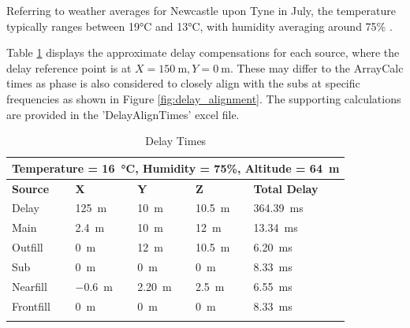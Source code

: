         Referring to weather averages for Newcastle upon Tyne in July, the temperature typically ranges between 19°C and 13°C, with humidity averaging around 75\% \citep{worldweatheronline2023}.

        Table \ref{tab:delay_times} displays the approximate delay compensations for each source, where the delay reference point is at $X=\SI{150}{\metre}, Y=\SI{0}{\metre}$. These may differ to the ArrayCalc times as phase is also considered to closely align with the subs at specific frequencies as shown in Figure \ref{fig:delay_alignment}. The supporting calculations are provided in the 'DelayAlignTimes' excel file.

        \begin{longtable}[c]{|lllll|}
            \hline
            \multicolumn{5}{|l|}{Temperature = \SI{16}{\celsius}, Humidity = 75\%, Altitude = \SI{64}{\metre}} \\ \hline
            \endfirsthead
            \endhead
            \multicolumn{1}{|l|}{\textbf{Source}} & \multicolumn{1}{l|}{\textbf{X}} & \multicolumn{1}{l|}{\textbf{Y}} & \multicolumn{1}{l|}{\textbf{Z}} & \textbf{Total Delay} \\ \hline
            \multicolumn{1}{|l|}{Delay} & \multicolumn{1}{l|}{\SI{125}{\metre}} & \multicolumn{1}{l|}{\SI{10}{\metre}} & \multicolumn{1}{l|}{\SI{10.5}{\metre}} & \multicolumn{1}{l|}{\SI{364.39}{\ms}} \\ \hline
            \multicolumn{1}{|l|}{Main} & \multicolumn{1}{l|}{\SI{2.4}{\metre}} & \multicolumn{1}{l|}{\SI{10}{\metre}} & \multicolumn{1}{l|}{\SI{12}{\metre}} & \multicolumn{1}{l|}{\SI{13.34}{\ms}} \\ \hline
            \multicolumn{1}{|l|}{Outfill} & \multicolumn{1}{l|}{\SI{0}{\metre}} & \multicolumn{1}{l|}{\SI{12}{\metre}} & \multicolumn{1}{l|}{\SI{10.5}{\metre}} & \multicolumn{1}{l|}{\SI{6.20}{\ms}} \\ \hline
            \multicolumn{1}{|l|}{Sub} & \multicolumn{1}{l|}{\SI{0}{\metre}} & \multicolumn{1}{l|}{\SI{0}{\metre}} & \multicolumn{1}{l|}{\SI{0}{\metre}} & \multicolumn{1}{l|}{\SI{8.33}{\ms}} \\ \hline
            \multicolumn{1}{|l|}{Nearfill} & \multicolumn{1}{l|}{\SI{-0.6}{\metre}} & \multicolumn{1}{l|}{\SI{2.20}{\metre}} & \multicolumn{1}{l|}{\SI{2.5}{\metre}} & \multicolumn{1}{l|}{\SI{6.55}{\ms}} \\ \hline
            \multicolumn{1}{|l|}{Frontfill} & \multicolumn{1}{l|}{\SI{0}{\metre}} & \multicolumn{1}{l|}{\SI{0}{\metre}} & \multicolumn{1}{l|}{\SI{0}{\metre}} & \multicolumn{1}{l|}{\SI{8.33}{\ms}} \\ \hline

            \caption{Delay Times}
            \label{tab:delay_times}
        \end{longtable}

